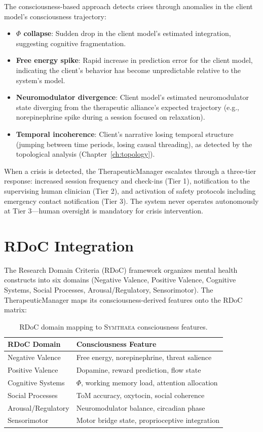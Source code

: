\documentclass[12pt]{book}
\newcommand{\symthaea}{\textsc{Symthaea}}
\begin{document}
The consciousness-based approach detects crises through anomalies in the client model's consciousness trajectory:
\begin{itemize}
  \item \textbf{$\Phi$ collapse}: Sudden drop in the client model's estimated integration, suggesting cognitive fragmentation.
  \item \textbf{Free energy spike}: Rapid increase in prediction error for the client model, indicating the client's behavior has become unpredictable relative to the system's model.
  \item \textbf{Neuromodulator divergence}: Client model's estimated neuromodulator state diverging from the therapeutic alliance's expected trajectory (e.g., norepinephrine spike during a session focused on relaxation).
  \item \textbf{Temporal incoherence}: Client's narrative losing temporal structure (jumping between time periods, losing causal threading), as detected by the topological analysis (Chapter~\ref{ch:topology}).
\end{itemize}

When a crisis is detected, the TherapeuticManager escalates through a three-tier response: increased session frequency and check-ins (Tier 1), notification to the supervising human clinician (Tier 2), and activation of safety protocols including emergency contact notification (Tier 3). The system never operates autonomously at Tier 3---human oversight is mandatory for crisis intervention.

\section{RDoC Integration}

The Research Domain Criteria (RDoC) framework organizes mental health constructs into six domains (Negative Valence, Positive Valence, Cognitive Systems, Social Processes, Arousal/Regulatory, Sensorimotor). The TherapeuticManager maps its consciousness-derived features onto the RDoC matrix:

\begin{table}[htbp]
\centering
\caption{RDoC domain mapping to \symthaea{} consciousness features.}
\label{tab:rdoc-mapping}
\begin{tabular}{@{}ll@{}}
\toprule
\textbf{RDoC Domain} & \textbf{Consciousness Feature} \\
\midrule
Negative Valence   & Free energy, norepinephrine, threat salience \\
Positive Valence   & Dopamine, reward prediction, flow state \\
Cognitive Systems  & $\Phi$, working memory load, attention allocation \\
Social Processes   & ToM accuracy, oxytocin, social coherence \\
Arousal/Regulatory & Neuromodulator balance, circadian phase \\
Sensorimotor       & Motor bridge state, proprioceptive integration \\
\bottomrule
\end{tabular}
\end{table}
\end{document}

